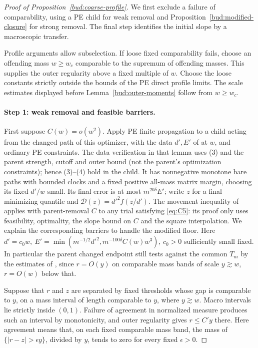 \begin{proof}[Proof of Proposition~\ref{bud:coarse-profile}]
We first exclude a failure of comparability, using a PE child for weak
removal and Proposition~\ref{bud:modified-closure} for strong removal.
The final step identifies the initial slope by a macroscopic transfer.

Profile arguments allow subselection. If loose fixed comparability
fails, choose an offending mass $w\ge w_c$ comparable to the supremum
of offending masses. This supplies the outer regularity above a fixed
multiple of $w$. Choose the loose constants strictly outside the bounds
of the PE direct profile limits. The scale estimates displayed before
Lemma~\ref{bud:outer-moments} follow from $w\ge w_c$.

\paragraph{Step 1: weak removal and feasible barriers.}

First suppose \(C(w)=o(w^2)\). Apply PE finite propagation to a child acting from the changed path of this optimizer, with the data \(d',E'\) of \cite[Lemma~6.2]{PE} at \(w\), and ordinary PE constraints. The data verification in that lemma uses (3) and the parent strength, cutoff and outer bound (not the parent's optimization constraints); hence (3)--(4) hold in the child. It has nonnegative monotone bare paths with bounded clocks and a fixed positive all-mass matrix margin, choosing its fixed \(d'/w\) small. Its final error is at most \(m^{20\delta}E'\); write \(z\) for a final minimizing quantile and \(\mathcal D(z)=d'^2 f(z/d')\). The movement inequality of \cite[Lemma~6.3]{PE} applies with parent-removal \(C\) to any trial satisfying \eqref{eq:C5}: its proof only uses feasibility, optimality, the slope bound on \(C\) and the square interpolation. We explain the corresponding barriers to handle the modified floor.
Here \(d'=c_0 w,\ E'=\min(m^{-1/2}d'^2,m^{-100\delta}C(w)w^3)\), \(c_0>0\) sufficiently small fixed. In particular the parent changed endpoint still tests against the common \(T_m\) by the estimates of \cite[Lemma~6.2]{PE}, since \(r=O(y)\) on comparable mass bands of scale \(y\gtrsim w\), \(r=O(w)\) below that.

Suppose that \(r\) and \(z\) are separated by fixed thresholds whose
gap is comparable to \(y\), on a mass interval of length comparable
to \(y\), where \(y\gtrsim w\). Macro intervals lie strictly inside
\((0,1)\). Failure of agreement in normalized measure produces such
an interval by monotonicity, and outer regularity gives \(r\le C'y\)
there. Here agreement means that, on each fixed comparable mass band,
the mass of \(\{|r-z|>\epsilon y\}\), divided by \(y\), tends to
zero for every fixed \(\epsilon>0\).


\end{proof}
